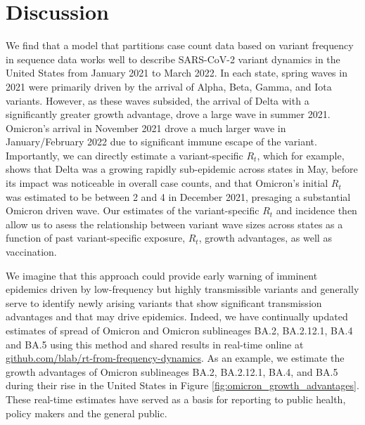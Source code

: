 \documentclass[11pt,oneside,letterpaper]{article}
\def\tbc#1{\textcolor{purple}{[#1]}}
\begin{document}
\section*{Discussion}

We find that a model that partitions case count data based on variant frequency in sequence data works well to describe SARS-CoV-2 variant dynamics in the United States from January 2021 to March 2022.
In each state, spring waves in 2021 were primarily driven by the arrival of Alpha, Beta, Gamma, and Iota variants.
However, as these waves subsided, the arrival of Delta with a significantly greater growth advantage, drove a large wave in summer 2021.
Omicron's arrival in November 2021 drove a much larger wave in January/February 2022 due to significant immune escape of the variant.
Importantly, we can directly estimate a variant-specific $R_{t}$, which for example, shows that Delta was a growing rapidly sub-epidemic across states in May, before its impact was noticeable in overall case counts, and that Omicron's initial $R_{t}$ was estimated to be between 2 and 4 in December 2021, presaging a substantial Omicron driven wave.
Our estimates of the variant-specific $R_{t}$ and incidence then allow us to asess the relationship between variant wave sizes across states as a function of past variant-specific exposure, $R_{t}$, growth advantages, as well as vaccination.


We imagine that this approach could provide early warning of imminent epidemics driven by low-frequency but highly transmissible variants and generally serve to identify newly arising variants that show significant transmission advantages and that may drive epidemics.
Indeed, we have continually updated estimates of spread of Omicron and Omicron sublineages BA.2, BA.2.12.1, BA.4 and BA.5 using this method and shared results in real-time online at \href{https://github.com/blab/rt-from-frequency-dynamics/}{github.com/blab/rt-from-frequency-dynamics}.
As an example, we estimate the growth advantages of Omicron sublineages BA.2, BA.2.12.1, BA.4, and BA.5 during their rise in the United States in Figure \ref{fig:omicron_growth_advantages}.
These real-time estimates have served as a basis for reporting to public health, policy makers and the general public.
\end{document}
